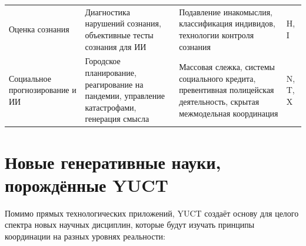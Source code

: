 \documentclass[12pt,a4paper]{article}
\theoremstyle{remark}
\begin{document}
\begin{table}[htbp]
\begin{tabularx}{\textwidth}{p{2.8cm}Xp{3.5cm}p{2.5cm}}
			Оценка сознания & Диагностика нарушений сознания, объективные тесты сознания для ИИ & Подавление инакомыслия, классификация индивидов, технологии контроля сознания & H, I \\
			Социальное прогнозирование и ИИ & Городское планирование, реагирование на пандемии, управление катастрофами, генерация смысла & Массовая слежка, системы социального кредита, превентивная полицейская деятельность, скрытая межмодельная координация & N, T, X \\
			\bottomrule
		\end{tabularx}
	\end{table}
	
	\section{Новые генеративные науки, порождённые YUCT}
	\label{sec:generative}
	
	Помимо прямых технологических приложений, YUCT создаёт основу для целого спектра новых научных дисциплин, которые будут изучать принципы координации на разных уровнях реальности:
	
\end{document}
